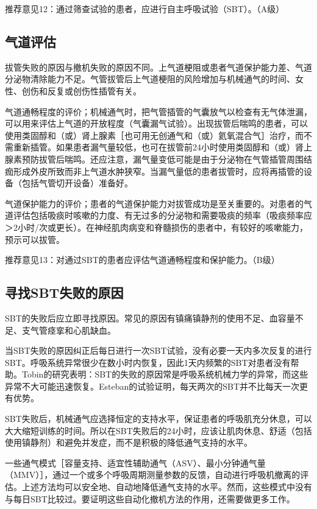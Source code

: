 推荐意见12：通过筛查试验的患者，应进行自主呼吸试验（SBT）。（A级）

\subsection{气道评估}

拔管失败的原因与撤机失败的原因不同。上气道梗阻或患者气道保护能力差、气道分泌物清除能力不足。气管拔管后上气道梗阻的风险增加与机械通气的时间、女性、创伤和反复或创伤性插管有关。

气道通畅程度的评价；机械通气时，把气管插管的气囊放气以检查有无气体泄漏，可以用来评估上气道的开放程度（气囊漏气试验）。出现拔管后喘鸣的患者，可以使用类固醇和（或）肾上腺素［也可用无创通气和（或）氦氧混合气］治疗，而不需重新插管。如果患者漏气量较低，也可在拔管前24小时使用类固醇和（或）肾上腺素预防拔管后喘鸣。还应注意，漏气量变低可能是由于分泌物在气管插管周围结痂形成外皮所致而非上气道水肿狭窄。当漏气量低的患者拔管时，应将再插管的设备（包括气管切开设备）准备好。

气道保护能力的评价；患者的气道保护能力对拔管成功是至关重要的。对患者的气道评估包括吸痰时咳嗽的力度、有无过多的分泌物和需要吸痰的频率（吸痰频率应＞2小时/次或更长）。在神经肌肉病变和脊髓损伤的患者中，有较好的咳嗽能力，预示可以拔管。

推荐意见13：对通过SBT的患者应评估气道通畅程度和保护能力。（B级）

\subsection{寻找SBT失败的原因}

SBT的失败后应立即寻找原因。常见的原因有镇痛镇静剂的使用不足、血容量不足、支气管痉挛和心肌缺血。

当SBT失败的原因纠正后每日进行一次SBT试验，没有必要一天内多次反复的进行SBT。呼吸系统异常很少在数小时内恢复，因此1天内频繁的SBT对患者没有帮助。Tobin的研究表明：SBT的失败的原因常是呼吸系统机械力学的异常，而这些异常不大可能迅速恢复。Esteban的试验证明，每天两次的SBT并不比每天一次更有优势。

SBT失败后，机械通气应选择恒定的支持水平，保证患者的呼吸肌充分休息，可以大大缩短训练的时间。所以在SBT失败后的24小时，应该让肌肉休息、舒适（包括使用镇静剂）和避免并发症，而不是积极的降低通气支持的水平。

一些通气模式［容量支持、适宜性辅助通气（ASV）、最小分钟通气量（MMV）］，通过一个或多个呼吸周期测量参数的反馈，自动进行呼吸机撤离的评估。上述方法均可以安全地、自动地降低通气支持的水平。然而，这些模式中没有与每日SBT比较过。要证明这些自动化撤机方法的作用，还需要做更多工作。

